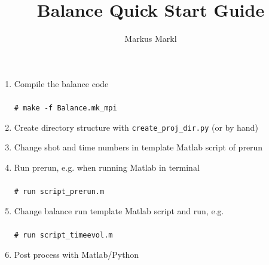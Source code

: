 \documentclass[11pt]{article}
\title{Balance Quick Start Guide}
\author{Markus Markl}
\newcommand{\shellcmd}[1]{\\\\\indent\indent\texttt{\footnotesize\# #1}\\}
\begin{document}
\maketitle
\begin{enumerate}
	\item Compile the balance code \shellcmd{make -f Balance.mk\_mpi}
	\item Create directory structure with \texttt{create\_proj\_dir.py} (or by hand)
	\item Change shot and time numbers in template Matlab script of prerun
	\item Run prerun, e.g. when running Matlab in terminal \shellcmd{run script\_prerun.m}
	\item Change balance run template Matlab script and run, e.g. \shellcmd{run script\_timeevol.m}
	\item Post process with Matlab/Python
\end{enumerate}


\end{document}
